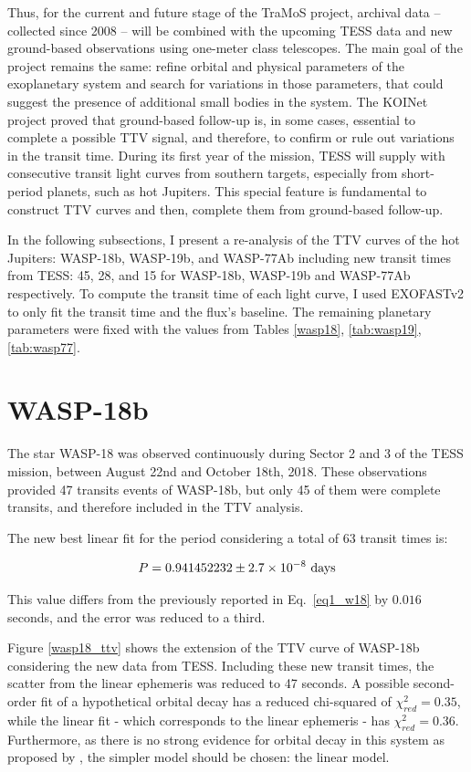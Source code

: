 Thus, for the current and future stage of the TraMoS project, archival data -- collected since 2008 -- will be combined with the upcoming TESS data and new ground-based observations using one-meter class telescopes. The main goal of the project remains the same: refine orbital and physical parameters of the exoplanetary system and search for variations in those parameters, that could suggest the presence of additional small bodies in the system. The KOINet project proved that ground-based follow-up is, in some cases, essential to complete a possible TTV signal, and therefore, to confirm or rule out variations in the transit time. During its first year of the mission, TESS will supply with consecutive transit light curves from southern targets, especially from short-period planets, such as hot Jupiters. This special feature is fundamental to construct TTV curves and then, complete them from ground-based follow-up.

In the following subsections, I present a re-analysis of the TTV curves of the hot Jupiters: WASP-18b, WASP-19b, and WASP-77Ab including new transit times from TESS: 45, 28, and 15 for WASP-18b, WASP-19b and WASP-77Ab respectively. To compute the transit time of each light curve, I used EXOFASTv2 to only fit the transit time and the flux's baseline. The remaining planetary parameters were fixed with the values from Tables \ref{wasp18}, \ref{tab:wasp19}, \ref{tab:wasp77}.

\section{WASP-18b}

The star WASP-18 was observed continuously during Sector 2 and 3 of the TESS mission, between August 22nd and October 18th, 2018. These observations provided 47 transits events of WASP-18b, but only 45 of them were complete transits, and therefore included in the TTV analysis. 

The new best linear fit for the period considering a total of 63 transit times is:

\begin{equation}
P = 0.941452232 \pm 2.7\times10^{-8} ~\rm days
\end{equation}

This value differs from the previously reported in Eq.~\ref{eq1_w18} by $0.016$ seconds, and the error was reduced to a third.

Figure \ref{wasp18_ttv} shows the extension of the TTV curve of WASP-18b considering the new data from TESS. Including these new transit times, the scatter from the linear ephemeris was reduced to 47 seconds. A possible second-order fit of a hypothetical orbital decay has a reduced chi-squared of $\chi^{2}_{red}=0.35$, while the linear fit - which corresponds to the linear ephemeris - has $\chi^{2}_{red}=0.36$. Furthermore, as there is no strong evidence for orbital decay in this system as proposed by \cite{Wilkins2017}, the simpler model should be chosen: the linear model.

